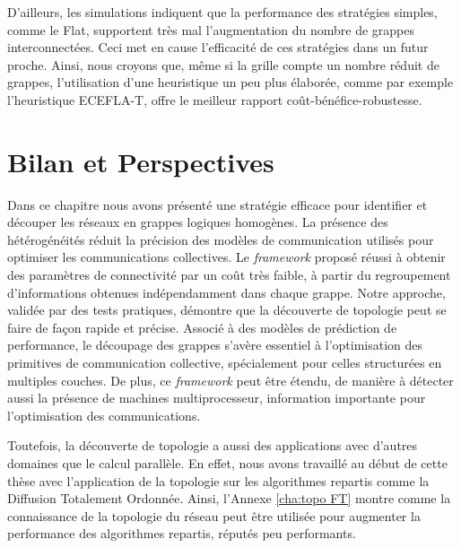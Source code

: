D'ailleurs, les simulations indiquent que la performance des stratégies
simples, comme le Flat, supportent très mal l'augmentation du nombre
de grappes interconnectées. Ceci met en cause l'efficacité de ces
stratégies dans un futur proche. Ainsi, nous croyons que, même si
la grille compte un nombre réduit de grappes, l'utilisation d'une
heuristique un peu plus élaborée, comme par exemple l'heuristique
ECEFLA-T, offre le meilleur rapport coût-bénéfice-robustesse.




\section{Bilan et Perspectives}

Dans ce chapitre nous avons présenté une stratégie efficace pour identifier
et découper les réseaux en grappes logiques homogènes. La présence
des hétérogénéités réduit la précision des modèles de communication
utilisés pour optimiser les communications collectives. Le \emph{framework}
proposé réussi à obtenir des paramètres de connectivité par un coût
très faible, à partir du regroupement d'informations obtenues indépendamment
dans chaque grappe. Notre approche, validée par des tests pratiques,
démontre que la découverte de topologie peut se faire de façon rapide
et précise. Associé à des modèles de prédiction de performance, le
découpage des grappes s'avère essentiel à l'optimisation des primitives
de communication collective, spécialement pour celles structurées
en multiples couches. De plus, ce \emph{framework} peut être étendu,
de manière à détecter aussi la présence de machines multiprocesseur,
information importante pour l'optimisation des communications.

Toutefois, la découverte de topologie a aussi des applications avec
d'autres domaines que le calcul parallèle. En effet, nous avons travaillé
au début de cette thèse avec l'application de la topologie sur les
algorithmes repartis comme la Diffusion Totalement Ordonnée. Ainsi,
l'Annexe \ref{cha:topo FT} montre comme la connaissance de la topologie
du réseau peut être utilisée pour augmenter la performance des algorithmes
repartis, réputés peu performants.


